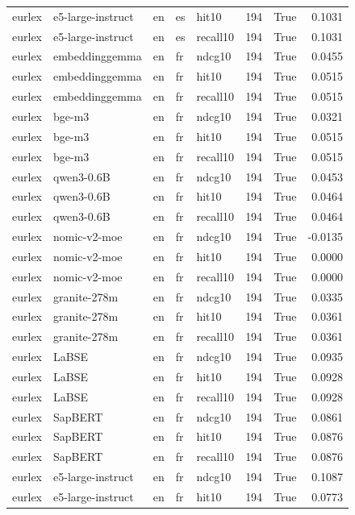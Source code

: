 \begin{tabular}{lllllrrr}
eurlex & e5-large-instruct & en & es & hit10 & 194 & True & 0.1031 \\
eurlex & e5-large-instruct & en & es & recall10 & 194 & True & 0.1031 \\
eurlex & embeddinggemma & en & fr & ndcg10 & 194 & True & 0.0455 \\
eurlex & embeddinggemma & en & fr & hit10 & 194 & True & 0.0515 \\
eurlex & embeddinggemma & en & fr & recall10 & 194 & True & 0.0515 \\
eurlex & bge-m3 & en & fr & ndcg10 & 194 & True & 0.0321 \\
eurlex & bge-m3 & en & fr & hit10 & 194 & True & 0.0515 \\
eurlex & bge-m3 & en & fr & recall10 & 194 & True & 0.0515 \\
eurlex & qwen3-0.6B & en & fr & ndcg10 & 194 & True & 0.0453 \\
eurlex & qwen3-0.6B & en & fr & hit10 & 194 & True & 0.0464 \\
eurlex & qwen3-0.6B & en & fr & recall10 & 194 & True & 0.0464 \\
eurlex & nomic-v2-moe & en & fr & ndcg10 & 194 & True & -0.0135 \\
eurlex & nomic-v2-moe & en & fr & hit10 & 194 & True & 0.0000 \\
eurlex & nomic-v2-moe & en & fr & recall10 & 194 & True & 0.0000 \\
eurlex & granite-278m & en & fr & ndcg10 & 194 & True & 0.0335 \\
eurlex & granite-278m & en & fr & hit10 & 194 & True & 0.0361 \\
eurlex & granite-278m & en & fr & recall10 & 194 & True & 0.0361 \\
eurlex & LaBSE & en & fr & ndcg10 & 194 & True & 0.0935 \\
eurlex & LaBSE & en & fr & hit10 & 194 & True & 0.0928 \\
eurlex & LaBSE & en & fr & recall10 & 194 & True & 0.0928 \\
eurlex & SapBERT & en & fr & ndcg10 & 194 & True & 0.0861 \\
eurlex & SapBERT & en & fr & hit10 & 194 & True & 0.0876 \\
eurlex & SapBERT & en & fr & recall10 & 194 & True & 0.0876 \\
eurlex & e5-large-instruct & en & fr & ndcg10 & 194 & True & 0.1087 \\
eurlex & e5-large-instruct & en & fr & hit10 & 194 & True & 0.0773 \\

\end{tabular}

